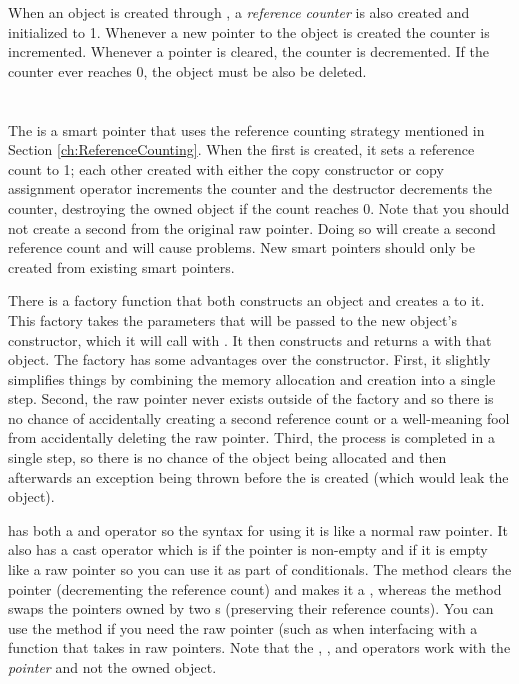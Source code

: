 When an object is created through \new, a \emph{reference counter} is also created and initialized to 1.
Whenever a new pointer to the object is created the counter is incremented.
Whenever a pointer is cleared, the counter is decremented.
If the counter ever reaches 0, the object must be also be deleted.


\section{\sharedptr}\label{ch:SharedPtr}

The \sharedptr is a smart pointer that uses the reference counting strategy mentioned in Section \ref{ch:ReferenceCounting}.
When the first \sharedptr is created, it sets a reference count to 1;
each other \sharedptr created with either the copy constructor or copy assignment operator increments the counter
and the destructor decrements the counter, destroying the owned object if the count reaches 0.
Note that you should not create a second \sharedptr from the original raw pointer.
Doing so will create a second reference count and will cause problems.
New smart pointers should only be created from existing smart pointers.

There is a factory function  that both constructs an object and creates a \sharedptr to it.
This factory takes the parameters that will be passed to the new object's constructor, which it will call with .
It then constructs and returns a \sharedptr with that object.
The factory has some advantages over the constructor.
First, it slightly simplifies things by combining the memory allocation and \sharedptr creation into a single step.
Second, the raw pointer never exists outside of the factory and so there is no chance of accidentally creating a second reference count or a well-meaning fool from accidentally deleting the raw pointer.
Third, the process is completed in a single step, so there is no chance of the object being allocated and then afterwards an exception being thrown before the \sharedptr is created (which would leak the object).

\sharedptr has both a \code{*} and \code{->} operator so the syntax for using it is like a normal raw pointer.
It also has a \booltype cast operator which is \true if the pointer is non-empty and \false if it is empty like a raw pointer so you can use it as part of conditionals.
The  method clears the pointer (decrementing the reference count) and makes it a \nullptr, whereas the  method swaps the pointers owned by two \sharedptr s (preserving their reference counts).
You can use the  method if you need the raw pointer (such as when interfacing with a function that takes in raw pointers.
Note that the \code{==}, \code{!=}, and \oplshift operators work with the \emph{pointer} and not the owned object.

